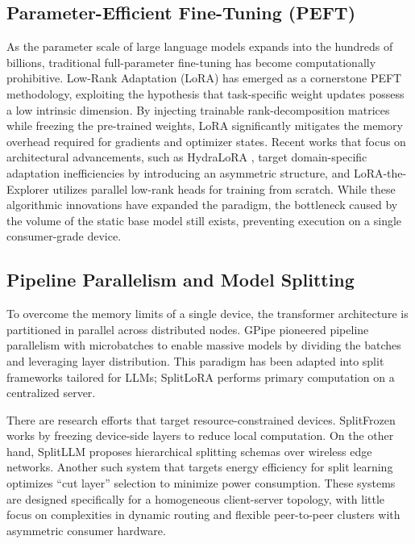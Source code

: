 \documentclass{ieeeaccess}
\begin{document}
\subsection{Parameter-Efficient Fine-Tuning (PEFT)}
As the parameter scale of large language models expands into the hundreds of billions, traditional full-parameter fine-tuning has become computationally prohibitive. Low-Rank Adaptation (LoRA) \cite{hu2021lora} has emerged as a cornerstone PEFT methodology, exploiting the hypothesis that task-specific weight updates possess a low intrinsic dimension. By injecting trainable rank-decomposition matrices while freezing the pre-trained weights, LoRA significantly mitigates the memory overhead required for gradients and optimizer states. Recent works that focus on architectural advancements, such as HydraLoRA \cite{tian2024hydralora}, target domain-specific adaptation inefficiencies by introducing an asymmetric structure, and LoRA-the-Explorer \cite{huh2024training} utilizes parallel low-rank heads for training from scratch. While these algorithmic innovations have expanded the paradigm, the bottleneck caused by the volume of the static base model still exists, preventing execution on a single consumer-grade device.

\subsection{Pipeline Parallelism and Model Splitting}
To overcome the memory limits of a single device, the transformer architecture is partitioned in parallel across distributed nodes. GPipe \cite{huang2019gpipe} pioneered pipeline parallelism with microbatches to enable massive models by dividing the batches and leveraging layer distribution. This paradigm has been adapted into split frameworks tailored for LLMs; SplitLoRA \cite{lin2024splitlora} performs primary computation on a centralized server.

There are research efforts that target resource-constrained devices. SplitFrozen \cite{ma2024splitfrozen} works by freezing device-side layers to reduce local computation. On the other hand, SplitLLM \cite{zhang2024splitllm} proposes hierarchical splitting schemas over wireless edge networks. Another such system that targets energy efficiency for split learning \cite{li2025energy} optimizes ``cut layer'' selection to minimize power consumption. These systems are designed specifically for a homogeneous client-server topology, with little focus on complexities in dynamic routing and flexible peer-to-peer clusters with asymmetric consumer hardware.
\end{document}
